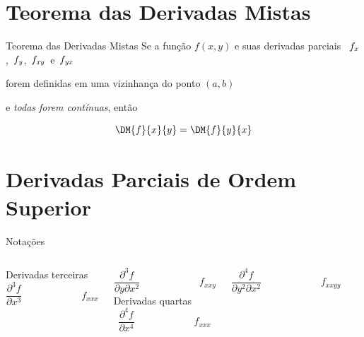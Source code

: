 


\section{Teorema das Derivadas Mistas}

\begin{frame}{Teorema das Derivadas Mistas}
  Se a função \(f(x, y)\) e suas derivadas parciais
  \, $f_\emph{x}$,\, $f_\emph{y}$,\, $f_{\emph{xy}}$\, e \,$f_{\emph{yx}}$

  \pause
  forem definidas em uma vizinhança do ponto \((a, b)\)

  \pause
  e \emph{todas forem contínuas}, então

  \pause
  \[
    \DM{f}{x}{y} = \DM{f}{y}{x}
  \]
\end{frame}



\section{Derivadas Parciais de Ordem Superior}

\begin{frame}{Notações}
  \begin{columns}
    Derivadas terceiras
    \[
      \frac{\partial^3 f}{\partial x^3} \qquad\qquad\qquad
      f_{xxx}
    \]

    \vspace{\baselineskip}
    \[
      \frac{\partial^3 f}{\partial y\partial x^2} \qquad\qquad\qquad
      f_{xxy}
    \]
    Derivadas quartas
    \[
      \frac{\partial^4 f}{\partial x^4} \qquad\qquad\qquad
      f_{xxx}
    \]

    \vspace{\baselineskip}
    \[
      \frac{\partial^4 f}{\partial y^2 \partial x^2} \qquad\qquad\qquad
      f_{xxyy}
    \]
  \end{columns}
\end{frame}

